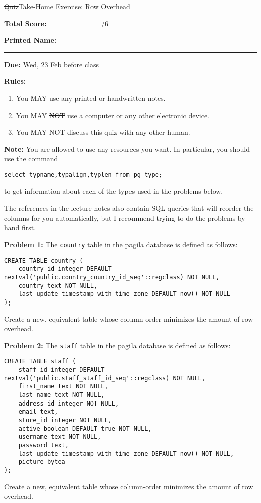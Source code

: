 \documentclass[10pt]{article}
\theoremstyle{definition}
\begin{document}
\begin{center}
{
\Large
    \sout{Quiz}Take-Home Exercise: Row Overhead
}

    \vspace{0.1in}
\end{center}


\vspace{0.15in}
\noindent
\textbf{Total Score:} ~~~~~~~~~~~~~~~/6

\vspace{0.5in}
\noindent
\textbf{Printed Name:}

\noindent
\rule{\textwidth}{0.1pt}
\vspace{0.25in}

\noindent\textbf{Due:} Wed, 23 Feb before class

\vspace{0.15in}
\noindent
\textbf{Rules:}
\begin{enumerate}
    \item You MAY use any printed or handwritten notes.
    \item You MAY \sout{NOT} use a computer or any other electronic device.
    \item You MAY \sout{NOT} discuss this quiz with any other human.
\end{enumerate}

\noindent
\textbf{Note:}
You are allowed to use any resources you want.
In particular, you should use the command
\begin{lstlisting}
select typname,typalign,typlen from pg_type;
\end{lstlisting}
to get information about each of the types used in the problems below.

The references in the lecture notes also contain SQL queries that will reorder the columns for you automatically, but I recommend trying to do the problems by hand first.

\newpage
\textbf{Problem 1:}
The \lstinline{country} table in the pagila database is defined as follows:
\begin{lstlisting}
CREATE TABLE country (
    country_id integer DEFAULT nextval('public.country_country_id_seq'::regclass) NOT NULL,
    country text NOT NULL,
    last_update timestamp with time zone DEFAULT now() NOT NULL
);
\end{lstlisting}
Create a new, equivalent table whose column-order minimizes the amount of row overhead.


\newpage
\textbf{Problem 2:}
The \lstinline{staff} table in the pagila database is defined as follows:
\begin{lstlisting}
CREATE TABLE staff (
    staff_id integer DEFAULT nextval('public.staff_staff_id_seq'::regclass) NOT NULL,
    first_name text NOT NULL,
    last_name text NOT NULL,
    address_id integer NOT NULL,
    email text,
    store_id integer NOT NULL,
    active boolean DEFAULT true NOT NULL,
    username text NOT NULL,
    password text,
    last_update timestamp with time zone DEFAULT now() NOT NULL,
    picture bytea
);
\end{lstlisting}
Create a new, equivalent table whose column-order minimizes the amount of row overhead.
\end{document}

